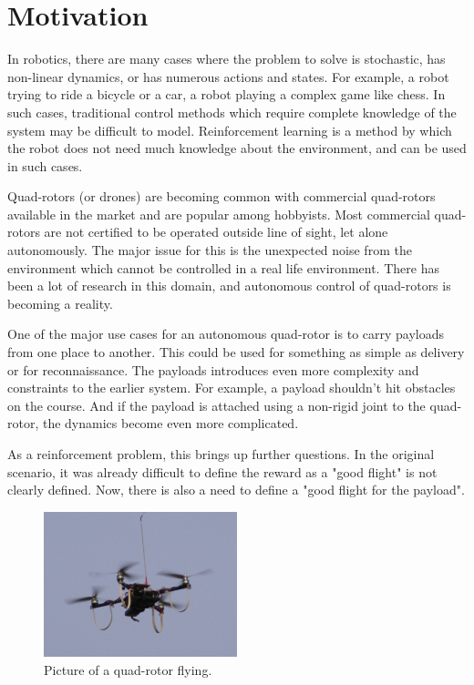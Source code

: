 \documentclass[hidelinks,BTech]{iitmdiss}
\begin{document}
\section{Motivation}

In robotics, there are many cases where the problem to solve is stochastic, has non-linear dynamics, or has numerous actions and states. For example, a robot trying to ride a bicycle or a car, a robot playing a complex game like chess. In such cases, traditional control methods which require complete knowledge of the system may be difficult to model. Reinforcement learning is a method by which the robot does not need much knowledge about the environment, and can be used in such cases.

Quad-rotors (or drones) are becoming common with commercial quad-rotors available in the market and are popular among hobbyists. Most commercial quad-rotors are not certified to be operated outside line of sight, let alone autonomously. The major issue for this is the unexpected noise from the environment which cannot be controlled in a real life environment. There has been a lot of research in this domain, and autonomous control of quad-rotors is becoming a reality.

One of the major use cases for an autonomous quad-rotor is to carry payloads from one place to another. This could be used for something as simple as delivery or for reconnaissance. The payloads introduces even more complexity and constraints to the earlier system. For example, a payload shouldn't hit obstacles on the course. And if the payload is attached using a non-rigid joint to the quad-rotor, the dynamics become even more complicated.

As a reinforcement problem, this brings up further questions. In the original scenario, it was already difficult to define the reward as a "good flight" is not clearly defined. Now, there is also a need to define a "good flight for the payload".

\begin{figure}[H]
  \centering
    \includegraphics[width=0.5\textwidth]{quadrotor.jpg}
    \caption{Picture of a quad-rotor flying.}
\end{figure}
\end{document}
